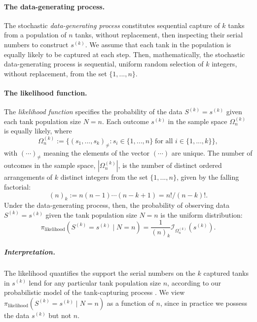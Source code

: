 \documentclass[11pt, oneside]{article}
\begin{document}
\paragraph{The data-generating process.}
The stochastic \emph{data-generating process} constitutes sequential capture of $k$ tanks from a population of $n$ tanks, without replacement, then inspecting their serial numbers to construct $s^{(k)}$.
We assume that each tank in the population is equally likely to be captured at each step.
Then, mathematically, the stochastic data-generating process is sequential, uniform random selection of $k$ integers, without replacement, from the set $\{1, ..., n\}$.

\paragraph{The likelihood function.}
The \emph{likelihood function} specifies the probability of the data $S^{(k)}=s^{(k)}$ given each tank population size $N=n$.
Each outcome $s^{(k)}$ in the sample space $\Omega_n^{(k)}$ is equally likely, where
\begin{equation}
	\Omega_n^{(k)} := \{ (s_1, ..., s_k)_{\neq}  :  s_i \in \{1, ..., n\} \; \text{for all } i \in \{ 1,..., k \} \},
\end{equation} with $(\cdots)_{\neq}$ meaning the elements of the vector $(\cdots)$ are unique. 
The number of outcomes in the sample space, $|\Omega_n^{(k)}|$, is the number of distinct ordered arrangements of $k$ distinct integers from the set $\{1,...,n\}$, given by the falling factorial:
\begin{equation}
	(n)_k:= n(n-1)\cdots (n-k+1) = n! / (n-k)!.
\end{equation}
Under the data-generating process, then, the probability of observing data $S^{(k)}=s^{(k)}$ given the tank population size $N=n$ is the uniform distribution:
\begin{equation}
	\pi_{\text{likelihood}}(S^{(k)}=s^{(k)} \mid N=n)=
	\dfrac{1}{(n)_k} \mathcal{I}_{\Omega_n^{(k)}}\left(s^{(k)}\right).
	\label{eq:dgp}
\end{equation}

\subparagraph{Interpretation.}
The likelihood quantifies the support the serial numbers on the $k$ captured tanks in $s^{(k)}$ lend for any particular tank population size $n$, according to our probabilistic model of the tank-capturing process \cite{van2021bayesian}. We view $\pi_{\text{likelihood}}(S^{(k)}=s^{(k)} \mid N=n)$ as a function of $n$, since in practice we possess the data $s^{(k)}$ but not $n$.
\end{document}
